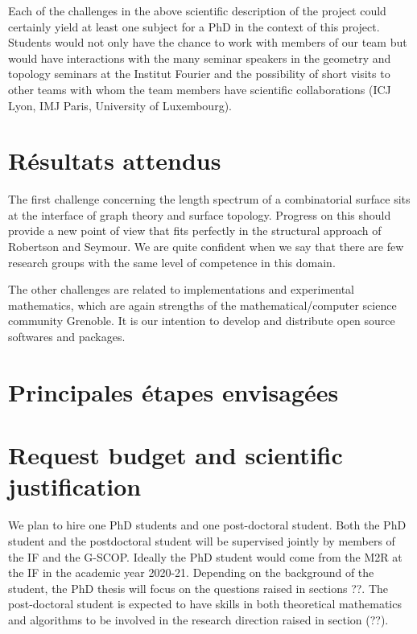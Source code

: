 \documentclass[14pt,fleqn]{article}
\begin{document}
Each of the challenges  in the above scientific description of the project
could certainly yield 
at least one subject for a PhD
in the context of this project.
Students would not only have the chance
to work with members of our team 
but would have interactions with
the  many seminar speakers 
in the geometry and topology seminars 
at the Institut Fourier
and the possibility of short visits
to other teams with whom the team members
have scientific collaborations
(ICJ Lyon, IMJ Paris, University of Luxembourg).




\section{Résultats attendus}

The first challenge concerning the length spectrum of a combinatorial surface sits at the interface of graph theory and surface topology. Progress on this should provide a new point of view that fits perfectly in the structural approach of Robertson and Seymour. We are quite confident when we say  that there are few research groups with the same level of competence  in this domain.

The other challenges are related to implementations and experimental mathematics, 
which are again strengths of the 
mathematical/computer science community Grenoble. 
It is our intention to develop and distribute open source softwares and packages.

\section{Principales étapes envisagées}


\section{ Request budget and scientific justification}

We plan to hire one PhD students and one post-doctoral student. 
Both the PhD student
and the postdoctoral student
will be supervised jointly 
by members of the IF and the G-SCOP.
Ideally the PhD student would
come from the M2R at the IF 
in the academic year 2020-21.
Depending on the background of the student, the PhD thesis will focus on the
questions raised in sections ??.
The post-doctoral student is expected to have skills in both
theoretical mathematics 
and algorithms
to be involved in the research direction raised in section (??).
\end{document}
